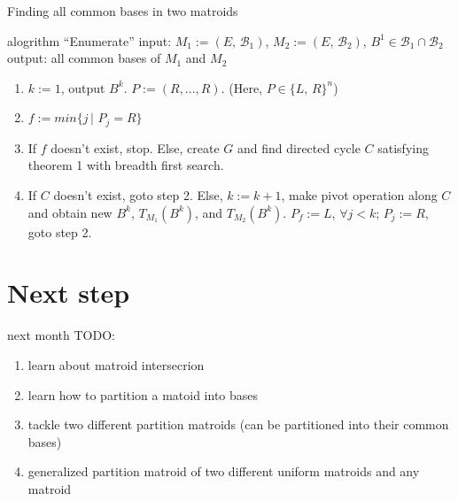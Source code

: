 \documentclass[11pt,xcolor=dvipsnames,table,dvipdfmx]{beamer}
\begin{document}
\begin{frame}{Finding all common bases in two matroids}
 \begin{block}{alogrithm ``Enumerate''}
  input: $M_1 := (E,\,\mathcal{B}_1)$, $M_2 := (E,\,\mathcal{B}_2)$, $B^1 \in \mathcal{B}_1 \cap \mathcal{B}_2$\\
  output: all common bases of $M_1$ and $M_2$\\
  \begin{enumerate}
   \item $k := 1$, output $B^k$. $P := (R, ..., R)$. (Here, $P \in \{L,\,R\}^n$)
   \item $f := min\{j\,|\,\,P_j = R\}$
   \item If $f$ doesn't exist, stop. Else, create $G$ and find directed cycle $C$ satisfying theorem 1 with breadth first search.
   \item If $C$ doesn't exist, goto step 2. Else, $k := k + 1$, make pivot operation along $C$ and obtain new $B^k$, $T_{M_1}(B^k)$, and $T_{M_2}(B^k)$. $P_f := L$, $\forall j < k;\,P_j := R$, goto step 2.
  \end{enumerate}
 \end{block}
\end{frame}


\section{Next step}
\begin{frame}{next month}
 TODO:
 \begin{enumerate}
  \item learn about matroid intersecrion
  \item learn how to partition a matoid into bases
  \item tackle two different partition matroids (can be partitioned into their common bases)
  \item generalized partition matroid of two different uniform matroids and any matroid
 \end{enumerate}
\end{frame}
\end{document}
